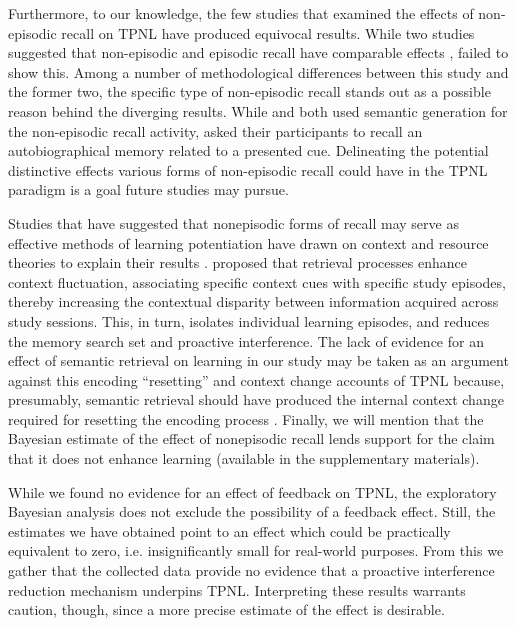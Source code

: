 \documentclass[../main.tex]{subfiles}
\begin{document}
Furthermore, to our knowledge, the few studies that examined the effects of 
non-episodic recall on TPNL have produced equivocal results. While two studies 
suggested that non-episodic and episodic recall have comparable effects
\citep{divisRetrievalSpeedsContext2014, 
pastotterRetrievalLearningFacilitates2011}, \cite{weinsteinNotAllRetrieval2015} 
failed to show this. Among a number of methodological differences between this 
study and the former two, the specific type of non-episodic recall stands out 
as a possible reason behind the diverging results. While 
\cite{pastotterRetrievalLearningFacilitates2011} and 
\cite{divisRetrievalSpeedsContext2014} both used semantic generation for the 
non-episodic recall activity, \cite{weinsteinNotAllRetrieval2015} asked their 
participants to recall an autobiographical memory related to a presented cue. 
Delineating the potential distinctive effects various forms of non-episodic 
recall could have in the TPNL paradigm is a goal future studies may pursue.

Studies that have suggested that nonepisodic forms of recall may serve 
as effective methods of learning potentiation have drawn on context and resource
theories to explain their results \citep{divisRetrievalSpeedsContext2014, 
pastotterRetrievalLearningFacilitates2011}. 
\cite{divisRetrievalSpeedsContext2014} proposed that retrieval processes 
enhance context fluctuation, associating specific context cues with specific 
study episodes, thereby increasing the contextual disparity between information 
acquired across study sessions. This, in turn, isolates individual learning 
episodes, and reduces the memory search set and proactive interference.
The lack of evidence for an effect of semantic retrieval 
on learning in our study may be taken as an argument against this encoding 
``resetting'' and context change accounts of TPNL because, presumably, semantic 
retrieval should have produced the internal context change required for 
resetting the encoding process 
\citep{pastotterRetrievalLearningFacilitates2011}. Finally, we will mention that
the Bayesian estimate of the effect of nonepisodic recall lends support for the
claim that it does not enhance learning (available in the supplementary
materials).

While we found no evidence for an effect of feedback on TPNL, the exploratory 
Bayesian analysis does not exclude the possibility of a feedback effect. Still, 
the estimates we have obtained point to an effect which could be practically 
equivalent to zero, i.e. insignificantly small for real-world purposes.
From this we gather that the collected data provide no evidence that a 
proactive interference reduction mechanism underpins TPNL. Interpreting these 
results warrants caution, though, since a more precise estimate of the effect 
is desirable.
\end{document}
